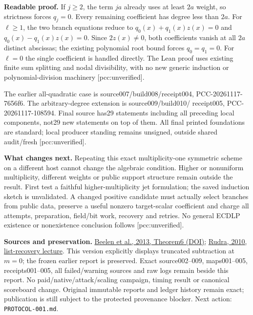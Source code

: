 \documentclass[10pt]{article}
\begin{document}
\textbf{Readable proof.} If $j\ge2$, the term $ja$ already uses at least
$2a$ weight, so strictness forces $q_j=0$. Every remaining coefficient has
degree less than $2a$. For $\ell\ge1$, the two branch equations reduce to
$q_0(x)+q_1(x)z(x)=0$ and $q_0(x)-q_1(x)z(x)=0$.
Since $2z(x)\ne0$, both coefficients vanish at all $2a$ distinct abscissas;
the existing polynomial root bound forces $q_0=q_1=0$. For $\ell=0$ the
single coefficient is handled directly. The Lean proof uses existing finite
sum splitting and nodal divisibility, with no new generic induction or
polynomial-division machinery [pcc:unverified].

The earlier all-quadratic case is source007/build008/receipt004,
PCC-20261117-7656f6. The arbitrary-degree extension is source009/build010/
receipt005, PCC-20261117-108594. Final source has29 statements including all
preceding local components, not29 new statements on top of them. All final
printed foundations are standard; local producer standing remains unsigned,
outside shared audit/fresh [pcc:unverified].

\textbf{What changes next.} Repeating this exact multiplicity-one symmetric
scheme on a different host cannot change the algebraic condition.
Higher or nonuniform multiplicity, different weights or public support
structure remain outside the result. First test a faithful higher-multiplicity
jet formulation; the saved induction sketch is unvalidated. A changed positive
candidate must actually select branches from public data, preserve a useful
nonzero target-scalar coefficient and charge all attempts, preparation,
field/bit work, recovery and retries. No general ECDLP existence or
nonexistence conclusion follows [pcc:unverified].

\textbf{Sources and preservation.}
\href{https://doi.org/10.1109/TIT.2013.2243800}{Beelen et al., 2013, Theorem6 (DOI)};
\href{https://cse.buffalo.edu/faculty/atri/courses/coding-theory/spr10/lectures/lect39.pdf}{Rudra, 2010, list-recovery lecture}.
This version explicitly displays truncated subtraction at $m=0$; the frozen earlier report is preserved. Exact source002--009, maps001--005, receipts001--005, all failed/warning
sources and raw logs remain beside this report. No paid/native/attack/scaling
campaign, timing result or canonical scoreboard change. Original immutable
reports and ledger history remain exact; publication is still subject to the
protected provenance blocker. Next action: \texttt{PROTOCOL-001.md}.
\end{document}

